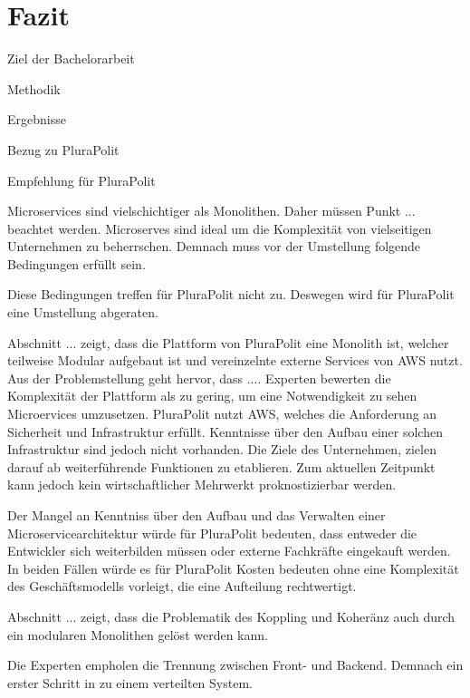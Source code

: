 \section{Fazit}

Ziel der Bachelorarbeit

Methodik

Ergebnisse

Bezug zu PluraPolit

Empfehlung für PluraPolit

Microservices sind vielschichtiger als Monolithen. Daher müssen Punkt ... beachtet werden.
Microserves sind ideal um die Komplexität von vielseitigen Unternehmen zu beherrschen.
Demnach muss vor der Umstellung folgende Bedingungen erfüllt sein.

Diese Bedingungen treffen für PluraPolit nicht zu. Deswegen wird für PluraPolit eine Umstellung abgeraten.


Abschnitt ... zeigt, dass die Plattform von PluraPolit eine Monolith ist, welcher teilweise Modular aufgebaut ist und vereinzelnte externe Services von AWS nutzt.
Aus der Problemstellung geht hervor, dass ....
Experten bewerten die Komplexität der Plattform als zu gering, um eine Notwendigkeit zu sehen Microervices umzusetzen.
PluraPolit nutzt AWS, welches die Anforderung an Sicherheit und Infrastruktur erfüllt. Kenntnisse über den Aufbau einer solchen Infrastruktur sind jedoch nicht vorhanden.
Die Ziele des Unternehmen, zielen darauf ab weiterführende Funktionen zu etablieren. Zum aktuellen Zeitpunkt kann jedoch kein wirtschaftlicher Mehrwerkt proknostizierbar werden.

Der Mangel an Kenntniss über den Aufbau und das Verwalten einer Microservicearchitektur würde für PluraPolit bedeuten, dass entweder die Entwickler sich weiterbilden müssen oder externe Fachkräfte eingekauft werden. In beiden Fällen würde es für PluraPolit Kosten bedeuten ohne eine Komplexität des Geschäftsmodells vorleigt, die eine Aufteilung rechtwertigt.

Abschnitt ... zeigt, dass die Problematik des Koppling und Koheränz auch durch ein modularen Monolithen gelöst werden kann.

Die Experten empholen die Trennung zwischen Front- und Backend.
Demnach ein erster Schritt in zu einem verteilten System.